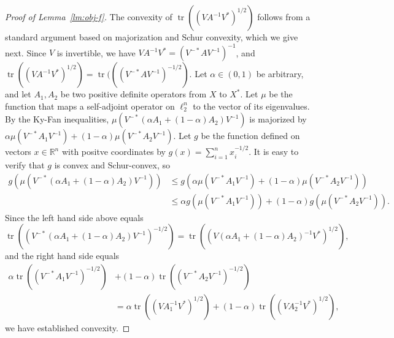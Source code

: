 \documentclass[11pt]{article}
\newcommand{\R}{{\mathbb{R}}}
\DeclareMathOperator{\tr}{tr}
\begin{document}
\begin{proof}[Proof of Lemma~\ref{lm:obj-f}]
  The convexity of $\tr((VA^{-1}V^*)^{1/2})$ follows from a standard
  argument based on majorization and Schur convexity, which we give
  next.  Since $V$ is invertible, we have $VA^{-1}V^* =
  (V^{-*}AV^{-1})^{-1}$, and $\tr((VA^{-1}V^*)^{1/2}) =
  \tr(((V^{-*}AV^{-1})^{-1/2})$. Let $\alpha \in (0,1)$ be arbitrary,
  and let $A_1, A_2$ be two positive definite operators from $X$ to
  $X^*$. Let $\mu$ be the function that maps a self-adjoint operator
  on $\ell_2^n$ to the vector of its eigenvalues. By the Ky-Fan
  inequalities, $\mu(V^{-*}(\alpha A_1 + (1-\alpha)A_2)V^{-1})$ is
  majorized by $\alpha \mu(V^{-*}A_1V^{-1}) + (1-\alpha)
  \mu(V^{-*}A_2V^{-1})$. Let $g$ be the function defined on vectors $x
  \in \R^n$ with positve coordinates by $g(x) =
  \sum_{i=1}^n{x_i^{-1/2}}$. It is easy to verify that $g$ is convex
  and Schur-convex, so
  \begin{align*}
  g(\mu(V^{-*}(\alpha A_1 + (1-\alpha)A_2)V^{-1}))
  &\le
  g(\alpha \mu(V^{-*}A_1V^{-1}) + (1-\alpha) \mu(V^{-*}A_2V^{-1}))\\
  &\le 
  \alpha g(\mu(V^{-*}A_1V^{-1})) + (1-\alpha) g(\mu(V^{-*}A_2V^{-1})).
  \end{align*}
  Since the left hand side above equals   
  \[
  \tr((V^{-*}(\alpha A_1 + (1-\alpha)A_2)V^{-1})^{-1/2})
  = 
  \tr((V(\alpha A_1 + (1-\alpha)A_2)^{-1}V^*)^{1/2}),
  \]
  and the right hand side equals
  \begin{align*}
  \alpha \tr((V^{-*}A_1V^{-1})^{-1/2}) &+  (1- \alpha) \tr((V^{-*}A_2V^{-1})^{-1/2})\\
  &= 
  \alpha \tr((VA_1^{-1}V^*)^{1/2}) +  (1- \alpha) \tr((VA_2^{-1}V^*)^{1/2}),
  \end{align*}
  we have established convexity.   
 


\end{proof}
\end{document}
